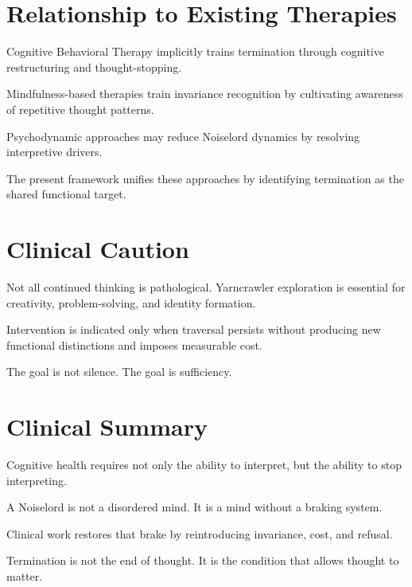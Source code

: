 \documentclass[12pt]{article}
\begin{document}
\section{Relationship to Existing Therapies}

Cognitive Behavioral Therapy implicitly trains termination through cognitive restructuring and thought-stopping.

Mindfulness-based therapies train invariance recognition by cultivating awareness of repetitive thought patterns.

Psychodynamic approaches may reduce Noiselord dynamics by resolving interpretive drivers.

The present framework unifies these approaches by identifying termination as the shared functional target.

\section{Clinical Caution}

Not all continued thinking is pathological. Yarncrawler exploration is essential for creativity, problem-solving, and identity formation.

Intervention is indicated only when traversal persists without producing new functional distinctions and imposes measurable cost.

The goal is not silence. The goal is sufficiency.

\section*{Clinical Summary}

Cognitive health requires not only the ability to interpret, but the ability to stop interpreting.

A Noiselord is not a disordered mind. It is a mind without a braking system.

Clinical work restores that brake by reintroducing invariance, cost, and refusal.

Termination is not the end of thought. It is the condition that allows thought to matter.
\end{document}
